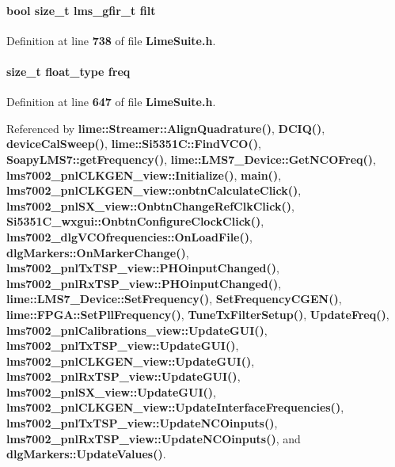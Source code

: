 \paragraph[{filt}]{\setlength{\rightskip}{0pt plus 5cm}bool size\+\_\+t {\bf lms\+\_\+gfir\+\_\+t} filt}\label{group__FN__ADVANCED_gaf8edd4fa11a3af99d15a1d2cf2ef5d9e}


Definition at line {\bf 738} of file {\bf Lime\+Suite.\+h}.

\paragraph[{freq}]{\setlength{\rightskip}{0pt plus 5cm}size\+\_\+t {\bf float\+\_\+type} freq}\label{group__FN__ADVANCED_gaaf6fa8c069646fc0704d9f667dc34e7c}


Definition at line {\bf 647} of file {\bf Lime\+Suite.\+h}.



Referenced by {\bf lime\+::\+Streamer\+::\+Align\+Quadrature()}, {\bf D\+C\+I\+Q()}, {\bf device\+Cal\+Sweep()}, {\bf lime\+::\+Si5351\+C\+::\+Find\+V\+C\+O()}, {\bf Soapy\+L\+M\+S7\+::get\+Frequency()}, {\bf lime\+::\+L\+M\+S7\+\_\+\+Device\+::\+Get\+N\+C\+O\+Freq()}, {\bf lms7002\+\_\+pnl\+C\+L\+K\+G\+E\+N\+\_\+view\+::\+Initialize()}, {\bf main()}, {\bf lms7002\+\_\+pnl\+C\+L\+K\+G\+E\+N\+\_\+view\+::onbtn\+Calculate\+Click()}, {\bf lms7002\+\_\+pnl\+S\+X\+\_\+view\+::\+Onbtn\+Change\+Ref\+Clk\+Click()}, {\bf Si5351\+C\+\_\+wxgui\+::\+Onbtn\+Configure\+Clock\+Click()}, {\bf lms7002\+\_\+dlg\+V\+C\+Ofrequencies\+::\+On\+Load\+File()}, {\bf dlg\+Markers\+::\+On\+Marker\+Change()}, {\bf lms7002\+\_\+pnl\+Tx\+T\+S\+P\+\_\+view\+::\+P\+H\+Oinput\+Changed()}, {\bf lms7002\+\_\+pnl\+Rx\+T\+S\+P\+\_\+view\+::\+P\+H\+Oinput\+Changed()}, {\bf lime\+::\+L\+M\+S7\+\_\+\+Device\+::\+Set\+Frequency()}, {\bf Set\+Frequency\+C\+G\+E\+N()}, {\bf lime\+::\+F\+P\+G\+A\+::\+Set\+Pll\+Frequency()}, {\bf Tune\+Tx\+Filter\+Setup()}, {\bf Update\+Freq()}, {\bf lms7002\+\_\+pnl\+Calibrations\+\_\+view\+::\+Update\+G\+U\+I()}, {\bf lms7002\+\_\+pnl\+Tx\+T\+S\+P\+\_\+view\+::\+Update\+G\+U\+I()}, {\bf lms7002\+\_\+pnl\+C\+L\+K\+G\+E\+N\+\_\+view\+::\+Update\+G\+U\+I()}, {\bf lms7002\+\_\+pnl\+Rx\+T\+S\+P\+\_\+view\+::\+Update\+G\+U\+I()}, {\bf lms7002\+\_\+pnl\+S\+X\+\_\+view\+::\+Update\+G\+U\+I()}, {\bf lms7002\+\_\+pnl\+C\+L\+K\+G\+E\+N\+\_\+view\+::\+Update\+Interface\+Frequencies()}, {\bf lms7002\+\_\+pnl\+Tx\+T\+S\+P\+\_\+view\+::\+Update\+N\+C\+Oinputs()}, {\bf lms7002\+\_\+pnl\+Rx\+T\+S\+P\+\_\+view\+::\+Update\+N\+C\+Oinputs()}, and {\bf dlg\+Markers\+::\+Update\+Values()}.

